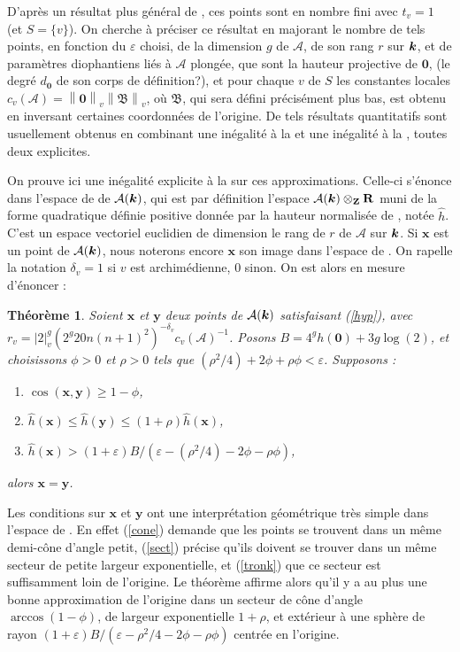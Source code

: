 \documentclass[11pt, twoside, a4paper, french]{article}
\newtheorem{thm}{Théorème} \newtheorem{prop}[thm]{Proposition} \newtheorem{lem}[thm]{Lemme} \newtheorem{coro}[thm]{Corollaire}
\numberwithin{equation}{section}
\renewcommand{\ge}{\geqslant} \renewcommand{\le}{\leqslant}
\newcommand{\eps}{\varepsilon} \newcommand{\truc}{\,\cdot\,}
\newcommand{\av}[2][v]{\left\lvert#2\right\rvert_{#1}} 		%
\newcommand{\nv}[2][v]{\left\lVert#2\right\rVert_{#1}} 		%
\newcommand{\dv}{{\delta_v}} 					%
\newcommand{\A}{\mathcal{A}} 					%
\newcommand{\p}[1]{{\boldsymbol{#1}}} 				%
\newcommand{\OA}{\p{0}} 					%
\newcommand{\BA}{\mathfrak{B}} 					%
\newcommand{\hn}{\hat{h}} 					%
\begin{document}
D'après un résultat plus général de , ces points sont en nombre fini avec $t_v = 1$ (et $S= \{v\}$). On cherche à préciser ce résultat en majorant le nombre de tels points, en fonction du $\eps$ choisi, de la dimension $g$ de $\A$, de son rang $r$ sur $\boldsymbol{k}$, et de paramètres diophantiens liés à $\A$ plongée, que sont la hauteur projective de $\OA$, (le degré $d_\OA$ de son corps de définition?), et pour chaque $v$ de $S$ les constantes locales $c_v(\A) = \nv{\OA}\nv{\BA}$, où $\BA$, qui sera défini précisément plus bas, est obtenu en inversant certaines coordonnées de l'origine. De tels résultats quantitatifs sont usuellement obtenus en combinant une inégalité à la  et une inégalité à la , toutes deux explicites.

On prouve ici une inégalité explicite à la  sur ces approximations. Celle-ci s'énonce dans l'espace de  de $\A(\cdn)$, qui est par définition l'espace $\A(\cdn)\otimes_\Z \R$ muni de la forme quadratique définie positive donnée par la hauteur normalisée de , notée $\hn$. C'est un espace vectoriel euclidien de dimension le rang de  $r$ de $\A$ sur $\boldsymbol{k}$. Si $\p{x}$ est un point de $\A(\cdn)$, nous noterons encore $\p{x}$ son image dans l'espace de . On rapelle la notation $\dv = 1$ si $v$ est archimédienne, $0$ sinon. On est alors en mesure d'énoncer :

\begin{thm} \label{mumpt}
Soient $\p{x}$ et $\p{y}$ deux points de $\A(\cdn)$ satisfaisant (\ref{hyp}), avec $r_v = \av{2}^g(2^g20n(n+1)^2)^{-\dv} c_v(\A)^{-1}$. Posons $B = 4^gh(\OA)+ 3g\log(2)$, et choisissons $\phi > 0$ et $\rho > 0$ tels que $(\rho^2/4) + 2\phi + \rho\phi< \eps$. Supposons :
\begin{enumerate}
\item $\cos(\p{x},\p{y}) \ge 1-\phi$, \label{cone}
\item $\hn(\p{x}) \le \hn(\p{y}) \le (1+\rho)\hn(\p{x})$, \label{sect}
\item $\hn(\p{x}) > (1+\eps)B/(\eps - (\rho^2/4) - 2\phi - \rho\phi)$, \label{tronk}
\end{enumerate}
alors $\p{x} = \p{y}$.
\end{thm}

Les conditions sur $\p{x}$ et $\p{y}$ ont une interprétation géométrique très simple dans l'espace de . En effet (\ref{cone}) demande que les points se trouvent dans un même demi-cône d'angle petit, (\ref{sect}) précise qu'ils doivent se trouver dans un même secteur de petite largeur exponentielle, et (\ref{tronk}) que ce secteur est suffisamment loin de l'origine. Le théorème affirme alors qu'il y a au plus une bonne approximation de l'origine dans un secteur de cône d'angle $\arccos(1-\phi)$, de largeur exponentielle $1+\rho$, et extérieur à une sphère de rayon $(1+\eps)B/(\eps - \rho^2/4 - 2\phi - \rho\phi )$ centrée en l'origine.
\end{document}
